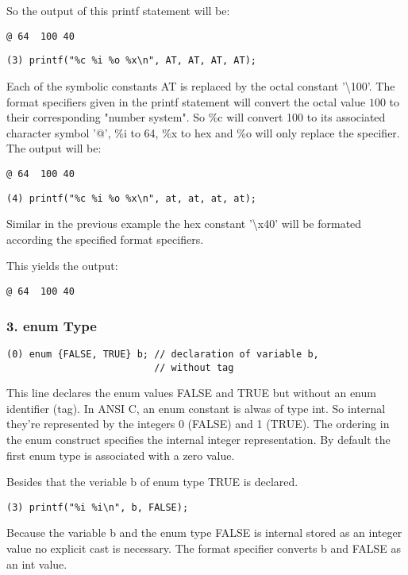 \documentclass[12pt]{article}
\begin{document}
So the output of this printf statement will be:

\begin{lstlisting}
@ 64  100 40
\end{lstlisting}


\begin{lstlisting}
(3) printf("%c %i %o %x\n", AT, AT, AT, AT);
\end{lstlisting}
Each of the symbolic constants AT is replaced by the octal constant '\textbackslash 100'. The format specifiers given in the printf statement will convert the octal value $100$ to their corresponding  "number system". So \%c will convert 100 to its associated character symbol '@', \%i to 64, \%x to hex and \%o will only replace the specifier.
The output will be:
\begin{lstlisting}
@ 64  100 40
\end{lstlisting}


\begin{lstlisting}
(4) printf("%c %i %o %x\n", at, at, at, at);
\end{lstlisting}
Similar in the previous example the hex constant '\textbackslash x40' will be formated according the specified format specifiers. 

This yields the output:
\begin{lstlisting}
@ 64  100 40
\end{lstlisting}


\subsubsection*{3. enum Type}
\begin{lstlisting}
(0) enum {FALSE, TRUE} b; // declaration of variable b,
                          // without tag
\end{lstlisting}
This line declares the enum values FALSE and TRUE but without an enum identifier (tag). In ANSI C, an enum constant is alwas of type int. So internal they're represented by the integers 0 (FALSE) and 1 (TRUE). The ordering in the enum construct specifies the internal integer representation. By default the first enum type is associated with a zero value. 

Besides that the veriable b of enum type TRUE is declared.

\begin{lstlisting}
(3) printf("%i %i\n", b, FALSE);
\end{lstlisting}
Because the variable b and the enum type FALSE is internal stored as an integer value no explicit cast is necessary. The format specifier converts b and FALSE as an int value. 
\end{document}
